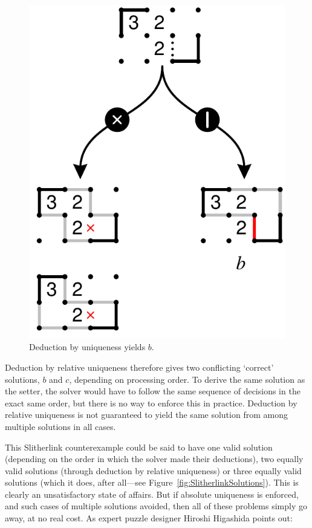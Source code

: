\documentclass[12pt]{gapd}
\begin{document}
\begin{figure}[htb]
  \centering
  \includegraphics[width=0.85\columnwidth]{graphics/slitherlink-deduce-b2.pdf}
  \caption{Deduction by uniqueness yields $b$.}
  \label{fig:SlitherlinkDeductionB}
\end{figure}

Deduction by relative uniqueness therefore gives two conflicting
`correct' solutions, $b$ and $c$, depending on processing order.  To
derive the same solution as the setter, the solver would have to
follow the same sequence of decisions in the exact same order, but
there is no way to enforce this in practice.  Deduction by relative
uniqueness is not guaranteed to yield the same solution from among
multiple solutions in all cases.

This Slitherlink counterexample could be said to have one valid
solution (depending on the order in which the solver made their
deductions), two equally valid solutions (through deduction by
relative uniqueness) or three equally valid solutions (which it does,
after all---see Figure~\ref{fig:SlitherlinkSolutions}).  This is
clearly an unsatisfactory state of affairs.  But if absolute
uniqueness is enforced, and such cases of multiple solutions avoided,
then all of these problems simply go away, at no real cost.  As expert
puzzle designer Hiroshi Higashida points out:
\end{document}
